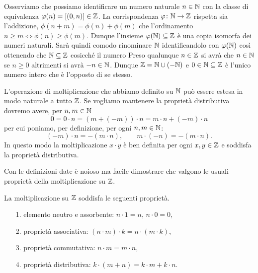 Osserviamo che possiamo identificare un numero naturale $n\in {\mathbb N}$ 
con la classe di equivalenza $\varphi(n) = {\left[ (0,n) \right]}\in {\mathbb Z}$.
La corrispondenza $\varphi\colon {\mathbb N}\to{\mathbb Z}$ rispetta sia l'addizione,
$\phi(n+m) = \phi(n)+\phi(m)$ che l'ordinamento $n\ge m \iff \phi(n)\ge \phi(m)$.
Dunque l'insieme $\varphi({\mathbb N})\subseteq {\mathbb Z}$ è una copia isomorfa dei 
numeri naturali. 
%
Sarà quindi comodo rinominare ${\mathbb N}$ identificandolo con $\varphi({\mathbb N})$ così 
ottenendo che ${\mathbb N}\subseteq {\mathbb Z}$ cosicché il numero 
Preso qualunque $n\in {\mathbb Z}$ si avrà che $n\in {\mathbb N}$ se $n\ge 0$ altrimenti 
si avrà $-n\in {\mathbb N}$. 
Dunque ${\mathbb Z} = {\mathbb N} \cup (-{\mathbb N})$ e $0\in {\mathbb N}\subseteq {\mathbb Z}$ 
è l'unico numero intero che è l'opposto di se stesso.

L'operazione di moltiplicazione che abbiamo definito su ${\mathbb N}$ può essere 
estesa in modo naturale a tutto ${\mathbb Z}$. 
Se vogliamo mantenere la proprietà distributiva dovremo avere, 
per $n,m\in{\mathbb N}$
\[
  0 = 0 \cdot n = (m+(-m))\cdot n = m\cdot n + (-m)\cdot n
\]
per cui poniamo, per definizione, per ogni $n,m\in {\mathbb N}$:
\[
  (-m) \cdot n = -(m\cdot n), \qquad  m \cdot (-n) = -(m\cdot n).
\]
In questo modo la moltiplicazione $x\cdot y$ 
è ben definita per ogni $x,y\in {\mathbb Z}$ e soddisfa la proprietà distributiva.

Con le definizioni date è noioso ma facile dimostrare 
che valgono le usuali proprietà della
moltiplicazione su ${\mathbb Z}$.

\begin{theorem}
  La moltiplicazione su ${\mathbb Z}$ soddisfa le seguenti proprietà.
  \begin{enumerate}
    \item[1.] elemento neutro e assorbente: $n\cdot 1 = n$, $n\cdot 0 = 0$,
    \item[2.] proprietà associativa: $(n\cdot m)\cdot k = n \cdot (m\cdot k)$,
    \item[3.] proprietà commutativa: $n\cdot m = m\cdot n$,
    \item[4.] proprietà distributiva: $k\cdot(m+n) = k\cdot m + k\cdot n$. 
  \end{enumerate}
\end{theorem}

